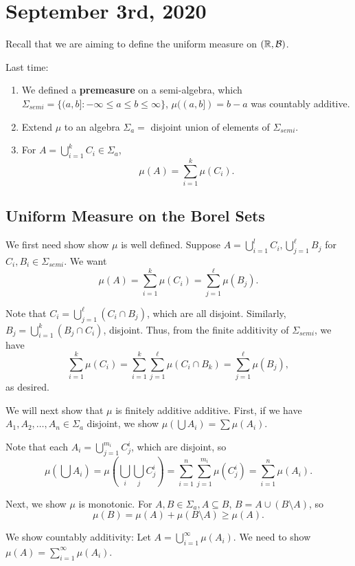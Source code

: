 \documentclass[11pt]{scrartcl}
\newcommand{\R}{\mathbb{R}}
\begin{document}
\section{September 3rd, 2020}
Recall that we are aiming to define the uniform measure on $(\R, \SB)$.  

Last time:
\begin{enumerate}
\item We defined a \textbf{premeasure} on a semi-algebra, which $\Sigma_{semi} = \{(a, b]: -\infty \le a \le b \le \infty\}$, $\mu((a, b]) = b-a$ was countably additive.  
\item Extend $\mu$ to an algebra $\Sigma_a = $ disjoint union of elements of $\Sigma_{semi}$.  
\item For $A = \bigcup_{i=1}^k C_i \in \Sigma_a$, $$\mu(A) = \sum_{i=1}^k \mu(C_i).$$
\end{enumerate}
\subsection{Uniform Measure on the Borel Sets}

We first need show show $\mu$ is well defined.  Suppose $A = \bigcup_{i=1}^l C_i, \bigcup_{j=1}^\ell B_j$ for $C_i, B_i \in \Sigma_{semi}$.  We want
$$\mu(A) = \sum_{i=1}^k \mu(C_i) = \sum_{j=1}^{\ell} \mu(B_j).$$

Note that $C_i = \bigcup_{j=1}^{\ell} (C_i \cap B_j)$, which are all disjoint.  Similarly, $B_j = \bigcup_{i=1}^k (B_j \cap C_i)$, disjoint.  Thus, from the finite additivity of $\Sigma_{semi}$, we have
$$\sum_{i=1}^k \mu(C_i) = \sum_{i=1}^k \sum_{j=1}^\ell \mu(C_i \cap B_k) = \sum_{j=1}^\ell \mu(B_j),$$
as desired.

We will next show that $\mu$ is finitely additive additive.  First, if we have $A_1, A_2, \dots, A_n \in \Sigma_a$ disjoint, we show $\mu\left (\bigcup A_i\right ) = \sum \mu(A_i)$.

Note that each $A_i = \bigcup_{j=1}^{m_i} C_j^i$, which are disjoint, so 
$$\mu\left (\bigcup A_i\right ) = \mu \left ( \bigcup_i \bigcup_j C_j^i\right ) = \sum_{i=1}^n \sum_{j=1}^{m_i} \mu(C_j^i) = \sum_{i=1}^n \mu(A_i).$$

Next, we show $\mu$ is monotonic.  For $A, B \in \Sigma_a, A \subseteq B$, $B = A \cup (B \setminus A)$, so $$\mu(B) = \mu(A) + \mu(B \setminus A) \ge \mu(A).$$

We show countably additivity: Let $A = \bigcup_{i=1}^{\infty} \mu(A_i)$.  We need to show $\mu(A) = \sum_{i=1}^{\infty} \mu(A_i)$.  
\end{document}
